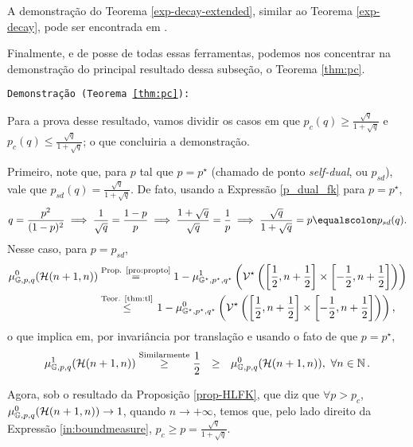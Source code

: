 A demonstração do Teorema \ref{exp-decay-extended}, similar ao Teorema \ref{exp-decay}, pode ser encontrada em \cite{duminil2019sharpdecisiontree}.

Finalmente, e de posse de todas essas ferramentas, podemos nos concentrar na demonstração do principal resultado dessa subseção, o Teorema \ref{thm:pc}.
\vspace{6pt}

\texttt{Demonstração (Teorema \ref{thm:pc}):}

Para a prova desse resultado, vamos dividir os casos em que $p_c(q) \geq \frac{\sqrt{q}}{1 + \sqrt{q}}$ e $p_c(q) \leq \frac{\sqrt{q}}{1 + \sqrt{q}}$; o que concluiria a demonstração. 

Primeiro, note que, para $p$ tal que $p = p^{\star}$ (chamado de ponto \textit{self-dual}, ou $p_{sd}$), vale que $p_{sd}(q) = \frac{\sqrt{q}}{1 + \sqrt{q}}$. De fato, usando a Expressão \eqref{p_dual_fk} para $p = p^{\star}$,
\begin{align*}
q = \frac{p^2}{(1 - p)^2}
\implies \frac{1}{\sqrt{q}} = \frac{1 - p}{p}
\implies \frac{1 + \sqrt{q}}{\sqrt{q}} = \frac{1}{p}
\implies \frac{\sqrt{q}}{1 + \sqrt{q}} = p \equalscolon p_{sd}(q).
\end{align*} 
Nesse caso, para $p = p_{sd}$,
\begin{align*}
\mu_{\mathbb{G}, p, q}^0(\operatorname{\mathcal{H}}(n + 1, n)) &\overset{\text{Prop. \ref{pro:propto}}}{=} 1 - \mu_{\mathbb{G}^{\star}, p^{\star}, q^{\star}}^1\left(\operatorname{\mathcal{V}}^{\star}\left(\left[\frac{1}{2}, n + \frac{1}{2}\right] \times \left[-\frac{1}{2}, n + \frac{1}{2}\right]\right)\right) \\
&\overset{\text{Teor. \ref{thm:tl}}}{\leq} \hspace{1pt} 1 - \mu_{\mathbb{G}^{\star}, p^{\star}, q^{\star}}^0\left(\operatorname{\mathcal{V}}^{\star}\left(\left[\frac{1}{2}, n + \frac{1}{2}\right] \times \left[-\frac{1}{2}, n + \frac{1}{2}\right]\right)\right),
\end{align*}
o que implica em, por invariância por translação e usando o fato de que $p = p^{\star}$,
\begin{align} \label{in:boundmeasure}
\mu_{\mathbb{G}, p, q}^1(\operatorname{\mathcal{H}}(n + 1, n)) \overset{\text{Similarmente}}{\geq} \frac{1}{2} \overset{\phantom{XXX}}{\geq} \mu_{\mathbb{G}, p, q}^0(\operatorname{\mathcal{H}}(n + 1, n)), ~\forall n \in \operatorname{\mathbb{N}}.
\end{align}

Agora, sob o resultado da Proposição \ref{prop-HLFK}, que diz que $\forall p > p_c$, $\mu_{\mathbb{G}, p, q}^0(\operatorname{\mathcal{H}}(n + 1, n)) \rightarrow 1$, quando $n \rightarrow +\infty$, temos que, pelo lado direito da Expressão \eqref{in:boundmeasure}, $p_{c} \geq p = \frac{\sqrt{q}}{1 + \sqrt{q}}$.

